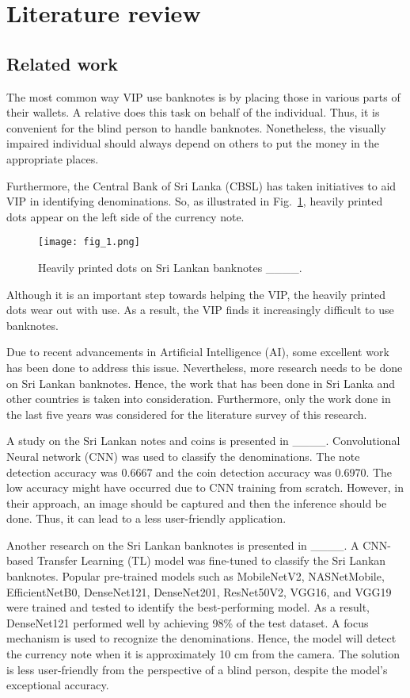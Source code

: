 \section{Literature review}
\subsection{Related work}
The most common way VIP use banknotes is by placing those in various parts of their wallets. A relative does this task on behalf of the individual. Thus, it is convenient for the blind person to handle banknotes. Nonetheless, the visually impaired individual should always depend on others to put the money in the appropriate places.

Furthermore, the Central Bank of Sri Lanka (CBSL) has taken initiatives to aid VIP in identifying denominations. So, as illustrated in Fig.~\ref{fig:my_image_1}, heavily printed dots appear on the left side of the currency note.
\begin{figure}[htbp]
    \centerline{\texttt{[image: fig\_1.png]}}
    \caption{Heavily printed dots on Sri Lankan banknotes ____.}
    \label{fig:my_image_1}
\end{figure}

Although it is an important step towards helping the VIP, the heavily printed dots wear out with use. As a result, the VIP finds it increasingly difficult to use banknotes.

Due to recent advancements in Artificial Intelligence (AI), some excellent work has been done to address this issue. Nevertheless, more research needs to be done on Sri Lankan banknotes. Hence, the work that has been done in Sri Lanka and other countries is taken into consideration. Furthermore, only the work done in the last five years was considered for the literature survey of this research.

A study on the Sri Lankan notes and coins is presented in ____. Convolutional Neural network (CNN) was used to classify the denominations. The note detection accuracy was 0.6667 and the coin detection accuracy was 0.6970. The low accuracy might have occurred due to CNN training from scratch. However, in their approach, an image should be captured and then the inference should be done. Thus, it can lead to a less user-friendly application.

Another research on the Sri Lankan banknotes is presented in ____. A CNN-based Transfer Learning (TL) model was fine-tuned to classify the Sri Lankan banknotes. Popular pre-trained models such as MobileNetV2, NASNetMobile, EfficientNetB0, DenseNet121, DenseNet201, ResNet50V2, VGG16, and VGG19 were trained and tested to identify the best-performing model. As a result, DenseNet121 performed well by achieving 98\% of the test dataset. A focus mechanism is used to recognize the denominations. Hence, the model will detect the currency note when it is approximately 10 cm from the camera. The solution is less user-friendly from the perspective of a blind person, despite the model's exceptional accuracy.

